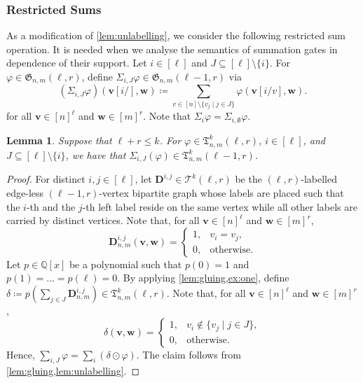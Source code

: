 \documentclass[10pt,a4paper]{article}
\theoremstyle{definition}
\theoremstyle{plain}
\newtheorem{lemma}[definition]{Lemma}
\theoremstyle{remark}
\renewcommand{\phi}{\varphi}
\begin{document}
 	\subsubsection{Restricted Sums}
	As a modification of \cref{lem:unlabelling},
	we consider the following restricted sum operation.
	It is needed when we analyse the semantics of summation gates in dependence of their support.
	Let $i \in [\ell]$ and $J \subseteq [\ell] \setminus \{i\}$.
	For $\phi \in \mathfrak{G}_{n,m}(\ell, r)$,
	define $\Sigma_{i, J} \phi \in \mathfrak{G}_{n,m}(\ell-1, r)$
	via \[ (\Sigma_{i, J} \phi)(\boldsymbol{v}[i/], \boldsymbol{w}) \coloneqq \sum_{v \in [n] \setminus \{v_j \mid j \in J\}} \phi(\boldsymbol{v}[i/v], \boldsymbol{w}). \]
	for all $\boldsymbol{v} \in [n]^\ell$ and $\boldsymbol{w} \in [m]^r$.
	Note that $\Sigma_i \phi = \Sigma_{i, \emptyset} \phi$.
	
	\begin{lemma}\label{lem:sum-exclude-lincomb}
		Suppose that $\ell+r \leq k$.
		For $\phi \in \mathfrak{T}^k_{n,m}(\ell,r )$,  $i \in [\ell]$, and $J \subseteq [\ell] \setminus \{i\}$,
		we have that $\Sigma_{i, J} (\phi) \in \mathfrak{T}^k_{n,m}(\ell-1, r)$.
	\end{lemma}
	\begin{proof}
		For distinct $i, j \in [\ell]$, 
		let $\boldsymbol{D}^{i,j} \in \mathcal{T}^{k}(\ell, r)$ be the $(\ell, r)$-labelled edge-less $(\ell-1,r)$-vertex bipartite graph whose labels are placed such that the $i$-th and the $j$-th left label
		reside on the same vertex while all other labels are carried by distinct vertices.
		Note that, for all $\boldsymbol{v} \in [n]^{\ell}$ and $\boldsymbol{w} \in [m]^r$,
		\begin{equation}\label{eq:diell}
			\boldsymbol{D}^{i,j}_{n,m}(\boldsymbol{v}, \boldsymbol{w}) = \begin{cases}
				1,& v_i = v_j, \\
				0,& \text{otherwise}.
			\end{cases}
		\end{equation}
		Let $p \in \mathbb{Q}[x]$ be a polynomial such that $p(0) = 1$ and $p(1) = \dots = p(\ell) = 0$.
		By applying \cref{lem:gluing,ex:one},
		define $\delta \coloneqq p(\sum_{j \in J} \boldsymbol{D}^{i,j}_{n,m}) \in \mathfrak{T}^k_{n,m}(\ell, r)$.
		Note that, for all $\boldsymbol{v} \in [n]^{\ell}$ and $\boldsymbol{w} \in [m]^r$,
		\[
			\delta(\boldsymbol{v}, \boldsymbol{w}) = \begin{cases}
				1, & v_i  \not\in \{v_j \mid j \in J\},\\
				0, & \text{otherwise}.
			\end{cases}
		\]
		Hence, $\sum_{i, J} \phi = \sum_{i} (\delta \odot \phi)$.
		The claim follows from \cref{lem:gluing,lem:unlabelling}.
	\end{proof}
\end{document}
